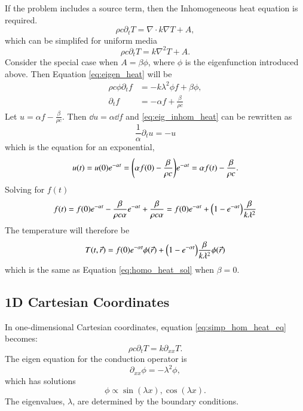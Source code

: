 \documentclass[letterpaper,12pt]{article}
\begin{document}
If the problem includes a source term, then the Inhomogeneous heat equation is required.
\begin{equation}
  \label{eq:inhom_heat_eq}
  \rho c \partial_t T = \nabla \cdot k \nabla T + A,
\end{equation}
which can be simplifed for uniform media
\begin{equation}
  \label{eq:simp_inhom_heat_eq}
  \rho c \partial_t T = k \nabla^2 T + A.
\end{equation}
Consider the special case when $A = \beta \phi$, where $\phi$ is the eigenfunction introduced
above. Then  Equation \ref{eq:eigen_heat} will be
\begin{align}
  \rho c \phi \partial_t f  &= -k \lambda^2 \phi f + \beta \phi ,\\
  \label{eq:eig_inhom_heat}
  \partial_t f  &= -\alpha f + \frac{\beta}{\rho c}
\end{align}
Let $u = \alpha f - \frac{\beta}{\rho c}$.
Then $\dd u = \alpha \dd f$ and \ref{eq:eig_inhom_heat} can
be rewritten as
\begin{equation}
  \frac{1}{\alpha} \partial_t u = -u
\end{equation}
which is the equation for an exponential,
\begin{align}
  u(t) = u(0)e^{-\alpha t} = \qty(\alpha  f(0) - \frac{\beta}{\rho c})e^{-\alpha t} = \alpha f(t) - \frac{\beta}{\rho c}.
\end{align}
Solving for $f(t)$
\begin{align}
 f(t)
 = f(0) e^{-\alpha t} - \frac{\beta}{\rho c \alpha} e^{-\alpha t} + \frac{\beta}{\rho c \alpha}
 = f(0) e^{-\alpha t} + \qty(1 - e^{-\alpha t})\frac{\beta}{k\lambda^2}
\end{align}
The temperature will therefore be
\begin{equation}
  \label{eq:inhomo_heat_sol}
  T(t,\vec{r}) =
  f(0) e^{-\alpha t}\phi(\vec{r}) + \qty(1 - e^{-\alpha t})\frac{\beta}{k \lambda^2} \phi(\vec{r})
\end{equation}
which is the same as Equation \ref{eq:homo_heat_sol} when $\beta = 0$.

\subsection{1D Cartesian Coordinates}
In one-dimensional Cartesian coordinates, equation \ref{eq:simp_hom_heat_eq} becomes:
\begin{equation}
  \label{eq:1d_simp_heat_eq}
  \rho c \partial_t T = k \partial_{xx} T.
\end{equation}
The eigen equation for the conduction operator is
\begin{equation}
  \label{eq:1d_eigen_eq}
  \partial_{xx} \phi = -\lambda^2 \phi,
\end{equation}
which has solutions
\begin{equation}
  \phi \propto \sin(\lambda x), \cos(\lambda x).
\end{equation}
The eigenvalues, $\lambda$, are determined by the boundary conditions.
\end{document}
